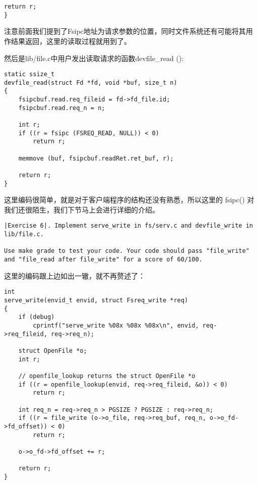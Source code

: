 \documentclass{article}
\newcommand{\funcname}[1]{{\ttfamily \small #1}}
\begin{document}
\begin{CJK*}{UTF8}{gkai}
\begin{lstlisting}[style=ccode, title={\scriptsize \ttfamily \bfseries fs/serv.c: serve\_read()}]
    return r;
}
\end{lstlisting}

注意前面我们提到了Fsipc地址为请求参数的位置，同时文件系统还有可能将其用作结果返回，这里的读取过程就用到了。

然后是lib/file.c中用户发出读取请求的函数\funcname{devfile\_read ()}:

\begin{lstlisting}[style=ccode, title={\scriptsize \ttfamily \bfseries lib/file.c: devfile\_read()}]
static ssize_t
devfile_read(struct Fd *fd, void *buf, size_t n)
{
    fsipcbuf.read.req_fileid = fd->fd_file.id;
    fsipcbuf.read.req_n = n;

    int r;
    if ((r = fsipc (FSREQ_READ, NULL)) < 0)
        return r;

    memmove (buf, fsipcbuf.readRet.ret_buf, r);

    return r;
}
\end{lstlisting}

这里编码很简单，就是对于客户端程序的结构还没有熟悉，所以这里的 \funcname{fsipc()} 对我们还很陌生，我们下节马上会进行详细的介绍。

\vspace{2em}

\begin{lstlisting}[style=exercise]
|Exercise 6|. Implement serve_write in fs/serv.c and devfile_write in lib/file.c.

Use make grade to test your code. Your code should pass "file_write" and "file_read after file_write" for a score of 60/100.
\end{lstlisting}

这里的编码跟上边如出一辙，就不再赘述了：
\begin{lstlisting}[style=ccode, title={\scriptsize \ttfamily \bfseries fs/serv.c: serve\_write()}]
int
serve_write(envid_t envid, struct Fsreq_write *req)
{
    if (debug)
        cprintf("serve_write %08x %08x %08x\n", envid, req->req_fileid, req->req_n);

    struct OpenFile *o;
    int r;

    // openfile_lookup returns the struct OpenFile *o 
    if ((r = openfile_lookup(envid, req->req_fileid, &o)) < 0)
		return r;

    int req_n = req->req_n > PGSIZE ? PGSIZE : req->req_n;
    if ((r = file_write (o->o_file, req->req_buf, req_n, o->o_fd->fd_offset)) < 0)
        return r;

    o->o_fd->fd_offset += r;

    return r;
}
\end{lstlisting}


\end{CJK*}
\end{document}
